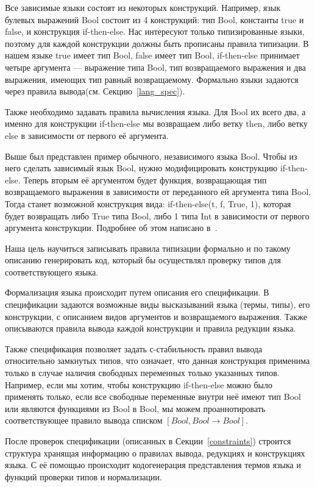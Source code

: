 \hfill

Все зависимые языки состоят из некоторых конструкций. Например, язык булевых выражений Bool состоит из 4 конструкций: тип Bool, константы true и false, и конструкция if-then-else. Нас интересуют только типизированные языки, поэтому для каждой конструкции должны быть прописаны правила типизации. В нашем языке true имеет тип Bool, false имеет тип Bool, if-then-else принимает четыре аргумента --- выражение типа Bool, тип возвращаемого выражения и два выражения, имеющих тип равный возвращаемому. Формально языки задаются через правила вывода(см. Секцию~\ref{lang_spec}).

Также необходимо задавать правила вычисления языка. Для Bool их всего два, а именно для конструкции if-then-else мы возвращаем либо ветку then, либо ветку else в зависимости от первого её аргумента.

Выше был представлен пример обычного, независимого языка Bool. Чтобы из него сделать зависимый язык Bool, нужно модифицировать конструкцию if-then-else. Теперь вторым её аргументом будет функция, возвращающая тип возвращаемого выражения в зависимости от переданного ей аргумента типа Bool. Тогда станет возможной конструкция вида: if-then-else(t, f, True, 1), которая будет возвращать либо True типа Bool, либо 1 типа Int в зависимости от первого аргумента конструкции. Подробнее об этом написано в~\cite{martin_lof}.

\hfill

Наша цель научиться записывать правила типизации формально и по такому описанию генерировать код, который бы осуществлял проверку типов для соответствующего языка.

Формализация языка происходит путем описания его спецификации. В спецификации задаются возможные виды высказываний языка (термы, типы), его конструкции, с описанием видов аргументов и возвращаемого выражения. Также описываются правила вывода каждой конструкции и правила редукции языка.

Также спецификация позволяет задать с-стабильность правил вывода относительно замкнутых типов, что означает, что данная конструкция применима только в случае наличия свободных переменных только указанных типов. Например, если мы хотим, чтобы конструкцию if-then-else можно было применять только, если все свободные переменные внутри неё имеют тип Bool или являются функциями из Bool в Bool, мы можем проаннотировать соответствующее правило вывода списком $[Bool, Bool\rightarrow Bool]$.

После проверок спецификации (описанных в Секции~\ref{constraints}) строится структура хранящая информацию о правилах вывода, редукциях и конструкциях языка. С её помощью происходит кодогенерация представления термов языка и функций проверки типов и нормализации.

